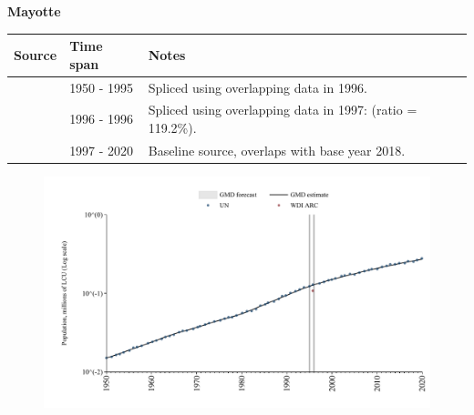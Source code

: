 \documentclass[12pt,a4paper,landscape]{article}
\begin{document}
\begin{adjustbox}{max totalsize={\paperwidth}{\paperheight},center}
\begin{minipage}[t][\textheight][t]{\textwidth}
\vspace*{0.5cm}
{}
\begin{center}
{\Large\bfseries Mayotte}
\end{center}
\vspace{0.5cm}
\begin{table}[H]
\centering
\small
\begin{tabular}{|l|l|l|}
\hline
\textbf{Source} & \textbf{Time span} & \textbf{Notes} \\
\hline
\rowcolor{white}\cite{UN}& 1950 - 1995 &Spliced using overlapping data in 1996.\\
\rowcolor{lightgray}\cite{WDI_ARC}& 1996 - 1996 &Spliced using overlapping data in 1997: (ratio = 119.2\%).\\
\rowcolor{white}\cite{UN}& 1997 - 2020 &Baseline source, overlaps with base year 2018.\\
\hline
\end{tabular}
\end{table}
\begin{figure}[H]
\centering
\includegraphics[width=\textwidth,height=0.6\textheight,keepaspectratio]{graphs/MYT_pop.pdf}
\end{figure}
\end{minipage}
\end{adjustbox}
\end{document}
